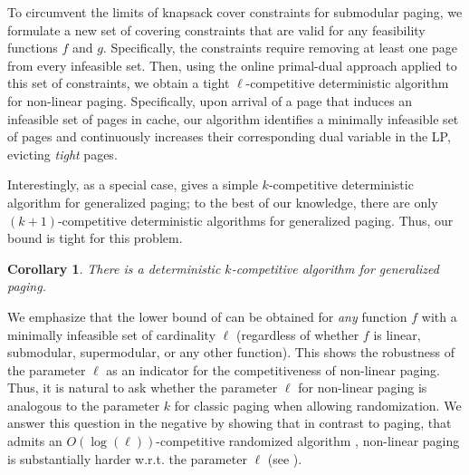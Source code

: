 \documentclass[11pt]{article}
\newtheorem{cor}[thm]{Corollary}
\begin{document}
To circumvent the limits of knapsack cover constraints for submodular paging, we formulate a new set of covering constraints that are valid for any feasibility functions $f$ and $g$. %
Specifically, the constraints require removing at least one page from every infeasible set. Then, using the online primal-dual approach applied to this set of constraints, we obtain a tight $\ell$-competitive deterministic algorithm for non-linear paging. Specifically, upon arrival of a page that induces an infeasible set of pages in cache, our algorithm identifies a minimally infeasible set of pages and continuously increases their corresponding dual variable in the LP, evicting {\em tight} pages.  %

Interestingly, as a special case,  gives a simple $k$-competitive deterministic algorithm for generalized paging; to the best of our knowledge, there are only $(k+1)$-competitive deterministic algorithms \cite{cao1997cost, young2002line} for generalized paging. Thus, our bound is tight for this problem.

\begin{cor}
	\label{thm:generalized}
	There is a deterministic $k$-competitive algorithm for \textnormal{generalized paging}. %
\end{cor}

We emphasize that the lower bound of  can be obtained for {\em any} function $f$ with a minimally infeasible set of cardinality $\ell$ (regardless of whether $f$ is linear, submodular, supermodular, or any other function). This shows the robustness of the parameter $\ell$ as an indicator for the competitiveness of non-linear paging. Thus, it is natural to ask whether the parameter $\ell$ for non-linear paging is analogous to the parameter $k$ for classic paging when allowing randomization. We answer this question in the negative by showing that in contrast to paging, that admits an $O(\log(\ell))$-competitive randomized algorithm \cite{fiat1991competitive}, non-linear paging is substantially harder w.r.t. the parameter $\ell$ (see ).
\end{document}
